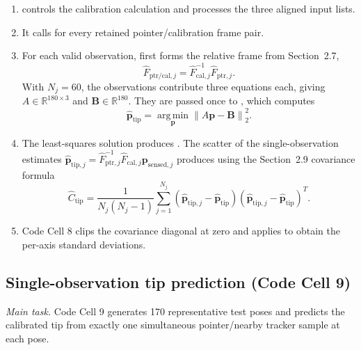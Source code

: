 \documentclass[11pt]{article}
\newcommand{\vct}[1]{\bm{#1}}
\newcommand{\norm}[1]{\left\|#1\right\|_2}
\begin{document}
\begin{enumerate}
\renewcommand{\labelenumi}{\roman{enumi}.}
\item {} controls the calibration calculation and processes the three aligned input lists.
\item It calls  for every retained pointer/calibration frame pair.
\item For each valid observation,  first forms the relative frame from Section~2.7,
\[
\widehat F_{\mathrm{ptr/cal},j}
=
\widehat F_{\mathrm{cal},j}^{-1}
\widehat F_{\mathrm{ptr},j}.
\]
With $N_j=60$, the observations contribute three equations each, giving $A\in\mathbb{R}^{180\times3}$ and $\vct{B}\in\mathbb{R}^{180}$.  They are passed once to , which computes
\[
\widehat{\vct{p}}_{\mathrm{tip}}
=
\underset{\vct{p}}{\operatorname{arg\,min}}
\norm{A\vct{p}-\vct{B}}^2.
\]
\item The least-squares solution produces .  The scatter of the single-observation estimates
$\widehat{\vct{p}}_{\mathrm{tip},j}
=\widehat F_{\mathrm{ptr},j}^{-1}
\widehat F_{\mathrm{cal},j}
\vct{p}_{\mathrm{sensed},j}$
produces  using the Section~2.9 covariance formula
\[
\widehat C_{\mathrm{tip}}
=
\frac{1}{N_j(N_j-1)}
\sum_{j=1}^{N_j}
(\widehat{\vct{p}}_{\mathrm{tip},j}-\widehat{\vct{p}}_{\mathrm{tip}})
(\widehat{\vct{p}}_{\mathrm{tip},j}-\widehat{\vct{p}}_{\mathrm{tip}})^T.
\]
\item Code Cell 8 clips the covariance diagonal at zero and applies  to obtain the per-axis standard deviations.
\end{enumerate}

\subsection{Single-observation tip prediction (Code Cell 9)}
\noindent\textit{Main task.} Code Cell 9 generates 170 representative test poses and predicts the calibrated tip from exactly one simultaneous pointer/nearby tracker sample at each pose.
\end{document}
